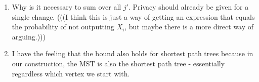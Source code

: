 \documentclass{article}
\begin{document}
{%


\begin{enumerate}
    \item  Why is it necessary to sum over all $j'$. Privacy should already be given for a single change.  (((I think this is just a way of getting an expression that equals the probability of not outputting $X_i$, but maybe there is a more direct way of arguing.)))
    \item I have the feeling that the bound also holds for shortest path trees because in our construction, the MST is also the shortest path tree - essentially regardless which vertex we start with.
\end{enumerate}
}
\end{document}
